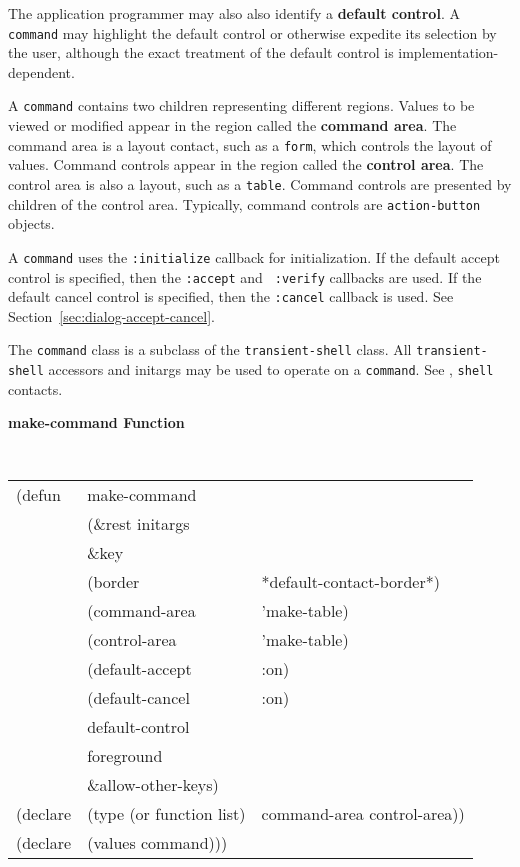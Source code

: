 The application programmer may also also identify a {\bf default
control}. A {\tt command} may highlight the
default control or otherwise expedite its selection by the user, although the
exact treatment of the default control is implementation-dependent.

A {\tt command} contains two children representing different regions.  Values
to be viewed or modified appear in the region called the {\bf command
area}.  The command area is a layout
contact, such as a {\tt form}, which controls the layout of
values.  Command controls appear in the region called the {\bf control
area}.  The control area is also a layout, such
as a {\tt table}.  Command controls are presented by children of the control
area.  Typically, command controls are {\tt action-button} objects.

A {\tt command} uses the {\tt :initialize} callback for initialization.  If
the default accept control is specified, then the {\tt :accept} and {\tt
:verify} callbacks are used.  If the default cancel control is specified, then
the {\tt :cancel} callback is used. See Section~\ref{sec:dialog-accept-cancel}.




The {\tt command} class is a subclass of the {\tt transient-shell} class.
All {\tt transient-shell} accessors and initargs may be used to operate on a
{\tt command}.  See \cite{clue}, {\tt shell}
contacts.

\pagebreak

{\samepage
{\large {\bf make-command \hfill Function}} 
\begin{flushright} \parbox[t]{6.125in}{
\tt
\begin{tabular}{lll}
\raggedright
(defun & make-command \\
       & (\&rest initargs \\
       & \&key  \\ 
       & (border                & *default-contact-border*) \\ 
       & (command-area          & 'make-table)\\    
       & (control-area          & 'make-table)\\    
       & (default-accept        & :on)\\    
       & (default-cancel        & :on)\\    
       & default-control \\
       & foreground \\
       & \&allow-other-keys) \\
(declare & (type (or function list)& command-area control-area))\\
(declare & (values   command)))
\end{tabular}
\rm

}\end{flushright}}


